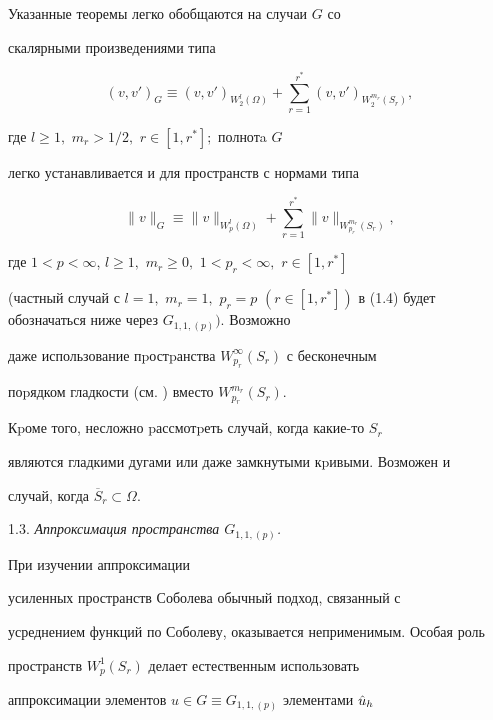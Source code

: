 Указанные теоремы легко обобщаются на случаи $G$ со


скаляр\-ными произведениями типа


\begin{equation}


(v,v')_{G}\equiv (v,v')_{W_2^l(\Omega)}+


\sum_{r=1}^{r^*}(v,v')_{W_2^{m_r}(S_r)},


\end{equation}


где $l\ge 1,$ $m_r> 1/2,$ $ r\in [1,r^{*}];$ полнотa $G$


легко устанавливается и для пространств с нормами типа


\begin{equation}


\|v\|_{G}\equiv \|v\|_{W_p^l(\Omega)}+


\sum_{r=1}^{r^{*}}\|v\|_{W_{p_r}^{m_r}(S_r)},


\end{equation}


где $1<p<\infty$, $l\ge 1,$ $m_r\ge 0,$ $1<p_r<\infty,$ $r\in [1,r^{*}]$


(частный случай с $l=1,$ $m_r=1,$ $p_r=p$  $(r\in


[1,r^{*}])$ в (1.4) будет обозначаться ниже через $G_{1,1,(p)}).$ Возможно


даже использование пpостpанства $W_{p_r}^{\infty}(S_r)$ с бесконечным


поpядком гладкости (см. \cite{Dub}) вместо $W_{p_r}^{m_r}(S_r).$


Кpоме того, несложно pассмотpеть случай, когда какие-то $S_r$


являются гладкими дугами или даже замкну\-тыми кpивыми. Возможен и


случай, когда $\overline S_r\subset \Omega$.





1.3. {\it Аппроксимация пространства $G_{1,1,(p)}$.}


При изучении ап\-проксимации


усиленных пространств Соболева обычный подход, связанный с


усреднением функций по Соболеву, оказывается не\-применимым. Особая роль


пространств $W_p^1(S_r)$ делает естествен\-ным использовать


аппроксимации элементов $u\in G\equiv G_{1,1,(p)}$ элементами $\Hat u_h$


